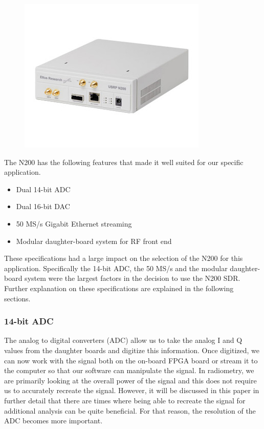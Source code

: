 {\begin{figure}[h!tb] 
\centering
\includegraphics{Images/n200}
\label{N200}
\end{figure}
}

The N200 has the following features that made it well suited for our specific application.

\begin{itemize}
\item Dual 14-bit ADC
\item Dual 16-bit DAC
\item 50 MS/s Gigabit Ethernet streaming
\item Modular daughter-board system for RF front end
\end{itemize}

These specifications had a large impact on the selection of the N200 for this application.  Specifically the 14-bit ADC, the 50 MS/s and the modular daughter-board system were the largest factors in the decision to use the N200 SDR.  Further explanation on these specifications are explained in the following sections.

\subsubsection{14-bit ADC}
The analog to digital converters (ADC) allow us to take the analog I and Q values from the daughter boards and digitize this information.  Once digitized, we can now work with the signal both on the on-board FPGA board or stream it to the computer so that our software can manipulate the signal.  In radiometry, we are primarily looking at the overall power of the signal and this does not require us to accurately recreate the signal.  However, it will be discussed in this paper in further detail that there are times where being able to recreate the signal for additional analysis can be quite beneficial.  For that reason, the resolution of the ADC becomes more important.

